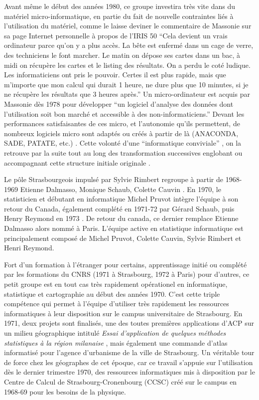 Avant même le début des années 1980, ce groupe investira très vite dans du matériel micro-informatique, en partie du fait de nouvelle contraintes liés à l'utilisation du matériel, comme le laisse deviner le commentaire de Massonie sur sa page Internet personnelle à propos de l'IRIS 50 \enquote{Cela devient un vrais ordinateur parce qu'on y a plus accès. La bête est enfermé dans un cage de verre, des techniciens le font marcher. Le matin on dépose ses cartes dans un bac, à midi on récupère les cartes et le listing des résultats. On a perdu le coté ludique. Les informaticiens ont pris le pouvoir. Certes il est plus rapide, mais que m'importe que mon calcul qui durait 1 heure, ne dure plus que 10 minutes, si je ne récupère les résultats que 3 heures après.} Un micro-ordinateur est acquis par Massonie dès 1978 pour développer \enquote{un logiciel d'analyse des données dont l'utilisation soit bon marché et accessible à des non-informaticiens.} Devant les performances satisfaisantes de ces micro, et l'autonomie qu'ils permettent, de nombreux logiciels micro sont adaptés ou créés à partir de là (ANACONDA, SADE, PATATE, etc.) \autocite{Massonie1986}. Cette volonté d'une \enquote{informatique conviviale} \autocite{TSH1984}, on la retrouve par la suite tout au long des transformation successives englobant ou accompagnant cette structure initiale originale .

Le pôle Strasbourgeois impulsé par Sylvie Rimbert regroupe à partir de 1968-1969 Etienne Dalmasso, Monique Schaub, Colette Cauvin . En 1970, le statisticien et débutant en informatique Michel Pruvot intègre l'équipe à son retour du Canada, également complété en 1971-72 par Gérard Schaub, puis Henry Reymond en 1973 \autocite[135-153]{Cuyala2014}. De retour du canada, ce dernier remplace Etienne Dalmasso alors nommé à Paris. L'équipe active en statistique informatique est principalement composé de Michel Pruvot, Colette Cauvin, Sylvie Rimbert et Henri Reymond.

Fort d'un formation à l'étranger pour certains, apprentissage initié ou complété par les formations du CNRS (1971 à Strasbourg, 1972 à Paris) pour d'autres, ce petit groupe est en tout cas très rapidement opérationel en informatique, statistique et cartographie au début des années 1970. C'est cette triple compétence qui permet à l'équipe d'utiliser très rapidement les ressources informatiques à leur disposition sur le campus universitaire de Strasbourg. En 1971, deux projets sont finalisés, une des toutes premières applications d’ACP sur un milieu géographique intitulé \textit{Essai d’application de quelques méthodes statistiques à la région milanaise} \autocite{Dalmasso1971}, mais également une commande d'atlas informatisé pour l'agence d'urbanisme de la ville de Strasbourg. Un véritable tour de force chez les géographes de cet époque, car ce travail s'appuie sur l'utilisation dès le dernier trimestre 1970, des ressources informatiques mis à disposition par le Centre de Calcul de Strasbourg-Cronenbourg (CCSC) créé sur le campus en 1968-69 pour les besoins de la physique.


